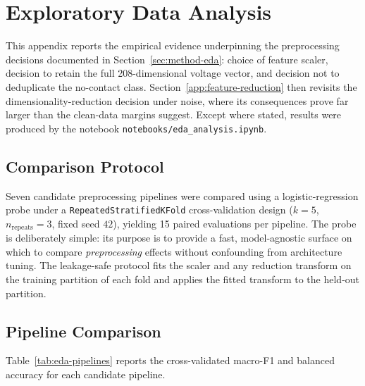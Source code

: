 \chapter{Exploratory Data Analysis}
\label{app:eda}

This appendix reports the empirical evidence underpinning the preprocessing decisions documented in Section~\ref{sec:method-eda}: choice of feature scaler, decision to retain the full 208-dimensional voltage vector, and decision not to deduplicate the no-contact class. Section~\ref{app:feature-reduction} then revisits the dimensionality-reduction decision under noise, where its consequences prove far larger than the clean-data margins suggest. Except where stated, results were produced by the notebook \texttt{notebooks/eda\_analysis.ipynb}.

\section{Comparison Protocol}
\label{app:eda-protocol}

Seven candidate preprocessing pipelines were compared using a logistic-regression probe under a \texttt{RepeatedStratifiedKFold} cross-validation design ($k=5$, $n_{\text{repeats}} = 3$, fixed seed $42$), yielding 15 paired evaluations per pipeline. The probe is deliberately simple: its purpose is to provide a fast, model-agnostic surface on which to compare \emph{preprocessing} effects without confounding from architecture tuning. The leakage-safe protocol fits the scaler and any reduction transform on the training partition of each fold and applies the fitted transform to the held-out partition.

\section{Pipeline Comparison}
\label{app:eda-pipelines}

Table~\ref{tab:eda-pipelines} reports the cross-validated macro-F1 and balanced accuracy for each candidate pipeline.

